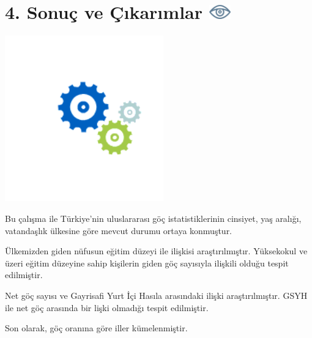 \documentclass[
  11pt,
  a4paper,
  DIV=11,
  numbers=noendperiod]{scrartcl}
\begin{document}
\section[{4. Sonuç ve Çıkarımlar} ]{\texorpdfstring{{4. Sonuç ve
Çıkarımlar}
\protect\includegraphics[width=0.36458in,height=\textheight]{images/clipboard-1698656164.png}}{4. Sonuç ve Çıkarımlar }}\label{sonuuxe7-ve-uxe7ux131karux131mlar}

\begin{center}
\includegraphics[width=2.69792in,height=\textheight]{images/sonuc.gif}
\end{center}

Bu çalışma ile Türkiye'nin uluslararası göç istatistiklerinin cinsiyet,
yaş aralığı, vatandaşlık ülkesine göre mevcut durumu ortaya konmuştur.

Ülkemizden giden nüfusun eğitim düzeyi ile ilişkisi araştırılmıştır.
Yüksekokul ve üzeri eğitim düzeyine sahip kişilerin giden göç sayısıyla
ilişkili olduğu tespit edilmiştir.

Net göç sayısı ve Gayrisafi Yurt İçi Hasıla arasındaki ilişki
araştırılmıştır. GSYH ile net göç arasında bir lişki olmadığı tespit
edilmiştir.

Son olarak, göç oranına göre iller kümelenmiştir.
\end{document}
